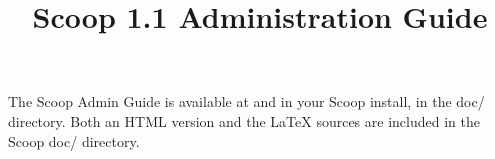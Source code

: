 \documentclass{article}
\title{Scoop 1.1 Administration Guide}
\begin{document}
\maketitle

The Scoop Admin Guide is available at  and in your Scoop install, in the doc/ directory. Both an HTML version and the LaTeX sources are included in the Scoop doc/ directory.


\latex{\tableofcontents}

\latex{\clearpage}



\latex{\clearpage}



\latex{\clearpage}



\latex{\clearpage}



\latex{\clearpage}



\latex{\clearpage}

\appendix



\latex{\clearpage}



\latex{\clearpage}


\end{document}
